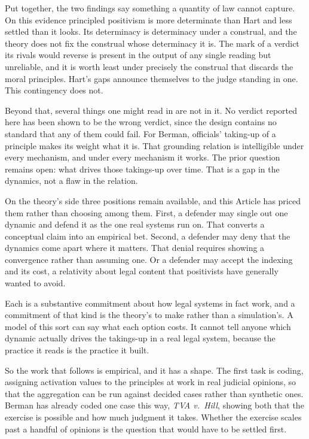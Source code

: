 Put together, the two findings say something a quantity of law cannot
capture. On this evidence principled positivism is more determinate than Hart and
less settled than it looks. Its determinacy is determinacy under a construal,
and the theory does not fix the construal whose determinacy it is. The mark of a verdict its rivals would reverse is present in the output of
any single reading but unreliable, and it is worth least under precisely
the construal that discards the moral principles. Hart's gaps announce themselves to the judge standing in one.
This contingency does not.

Beyond that, several things one might read in are not in it. No verdict
reported here has been shown to be the wrong verdict, since the design
contains no standard that any of them could fail. For Berman, officials' taking-up of a principle makes its weight what it
is. That grounding relation is intelligible under every mechanism, and
under every mechanism it works. The prior question remains open: what
drives those takings-up over time. That is a gap in the
dynamics, not a flaw in the relation.

On the theory's side three positions remain available, and this Article has
priced them rather than choosing among them. First, a defender may single out one dynamic and defend it as the one real
systems run on. That converts a conceptual claim into an empirical bet.
Second, a defender may deny that the dynamics come apart where it matters.
That denial requires showing a convergence rather than assuming one. Or a defender may accept the indexing and its cost,
a relativity about legal content that positivists have generally wanted to
avoid.

Each is a substantive commitment about how legal systems in fact work, and
a commitment of that kind is the theory's to make rather than a
simulation's. A model of this sort can say what each option
costs. It cannot tell anyone which dynamic actually drives the
takings-up in a real legal system, because the practice it reads is the
practice it built.

So the work that follows is empirical, and it has a shape. The first task
is coding, assigning activation values to the principles at work in real
judicial opinions, so that the aggregation can be run against decided cases
rather than synthetic ones. Berman has already coded one case this way,
\textit{TVA v.\ Hill}, showing both that the exercise is possible and
how much judgment it takes. Whether the exercise scales past a handful of
opinions is the question that would have to be settled first.

